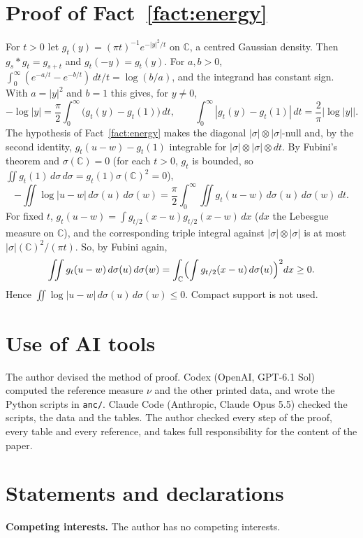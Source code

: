 \documentclass{amsart}
\numberwithin{equation}{section}
\numberwithin{table}{section}
\begin{document}
\section{Proof of Fact~\ref{fact:energy}}\label{app:energy}

For $t>0$ let $g_t(y)=(\pi t)^{-1}e^{-|y|^2/t}$ on $\mathbb C$, a centred
Gaussian density. Then $g_s*g_t=g_{s+t}$ and $g_t(-y)=g_t(y)$. For $a,b>0$,
$\int_0^\infty(e^{-a/t}-e^{-b/t})\,dt/t=\log(b/a)$, and the integrand has
constant sign. With $a=|y|^2$ and $b=1$ this gives, for $y\ne0$,
\[
 -\log|y|=\frac\pi2\int_0^\infty\bigl(g_t(y)-g_t(1)\bigr)\,dt,\qquad
 \int_0^\infty|g_t(y)-g_t(1)|\,dt=\frac2\pi\bigl|\log|y|\bigr|.
\]
The hypothesis of Fact~\ref{fact:energy} makes the diagonal
$|\sigma|\otimes|\sigma|$-null and, by the second identity,
$g_t(u-w)-g_t(1)$ integrable for $|\sigma|\otimes|\sigma|\otimes dt$. By
Fubini's theorem and $\sigma(\mathbb C)=0$ (for each $t>0$, $g_t$ is
bounded, so $\iint g_t(1)\,d\sigma\,d\sigma=g_t(1)\sigma(\mathbb C)^2=0$),
\[
 -\iint\log|u-w|\,d\sigma(u)\,d\sigma(w)
 =\frac\pi2\int_0^\infty\iint g_t(u-w)\,d\sigma(u)\,d\sigma(w)\,dt.
\]
For fixed $t$, $g_t(u-w)=\int g_{t/2}(x-u)g_{t/2}(x-w)\,dx$ ($dx$ the
Lebesgue measure on $\mathbb C$), and the
corresponding triple integral against $|\sigma|\otimes|\sigma|$ is at most
$|\sigma|(\mathbb C)^2/(\pi t)$. So, by Fubini again,
\[
 \iint g_t(u-w)\,d\sigma(u)\,d\sigma(w)
 =\int_{\mathbb C}\Bigl(\int g_{t/2}(x-u)\,d\sigma(u)\Bigr)^2dx\ge0.
\]
Hence $\iint\log|u-w|\,d\sigma(u)\,d\sigma(w)\le0$. Compact support is not
used.

\section*{Use of AI tools}

The author devised the method of proof. Codex (OpenAI, GPT-6.1 Sol) computed the
reference measure $\nu$ and the other printed data, and wrote the Python
scripts in \texttt{anc/}. Claude Code (Anthropic,
Claude Opus 5.5) checked the scripts, the
data and the tables. The author checked every step
of the proof, every table and every reference, and takes full responsibility
for the content of the paper.

\section*{Statements and declarations}

\textbf{Competing interests.} The author has no competing interests.
\end{document}
